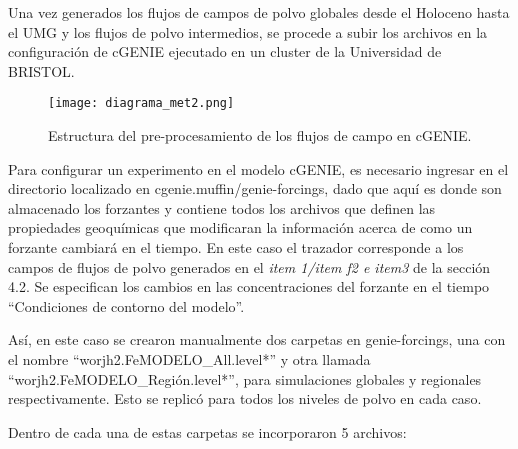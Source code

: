 Una vez generados los flujos de campos de polvo globales desde el Holoceno hasta el UMG y los flujos de polvo intermedios, se procede a subir los archivos en la configuración de cGENIE ejecutado en un cluster de la Universidad de BRISTOL.

\begin{figure}[H]
\centering
  \texttt{[image: diagrama\_met2.png]}
  \caption[Pre-procesamiento modelo cGENIE]{Estructura del pre-procesamiento de los flujos de campo en cGENIE.}
  \label{fig:diagrama_met2}
\end{figure}

 Para configurar un experimento en el modelo cGENIE, es necesario ingresar en el directorio localizado en cgenie.muffin/genie-forcings, dado que aqu\'i es donde son almacenado los forzantes y contiene todos los archivos que definen las propiedades geoqu\'imicas que modificaran la informaci\'on acerca de como un forzante cambiar\'a en el tiempo. En este caso el trazador corresponde a los campos de flujos de polvo generados en el \textit{item 1/item f2 e item3} de la secci\'on 4.2. Se especifican los cambios en las concentraciones del forzante en el tiempo ``Condiciones de contorno del modelo''. 

 Así, en este caso se crearon manualmente dos carpetas en genie-forcings, una con el nombre ``worjh2.FeMODELO\_All.level*'' y otra llamada ``worjh2.FeMODELO\_Regi\'on.level*'', para simulaciones globales y regionales respectivamente. Esto se replic\'o para todos los niveles de polvo en cada caso. 

Dentro de cada una de estas carpetas se incorporaron 5 archivos: 

